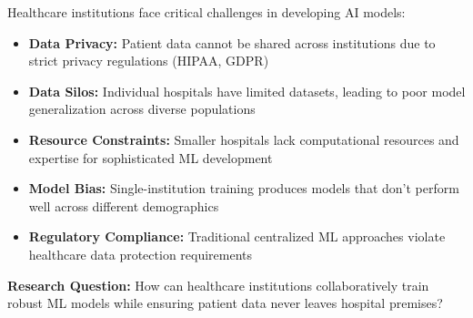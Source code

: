 Healthcare institutions face critical challenges in developing AI models:

\begin{itemize}[noitemsep]
    \item \textbf{Data Privacy:} Patient data cannot be shared across institutions due to strict privacy regulations (HIPAA, GDPR)
    \item \textbf{Data Silos:} Individual hospitals have limited datasets, leading to poor model generalization across diverse populations
    \item \textbf{Resource Constraints:} Smaller hospitals lack computational resources and expertise for sophisticated ML development
    \item \textbf{Model Bias:} Single-institution training produces models that don't perform well across different demographics
    \item \textbf{Regulatory Compliance:} Traditional centralized ML approaches violate healthcare data protection requirements
\end{itemize}

\textbf{Research Question:} How can healthcare institutions collaboratively train robust ML models while ensuring patient data never leaves hospital premises?
